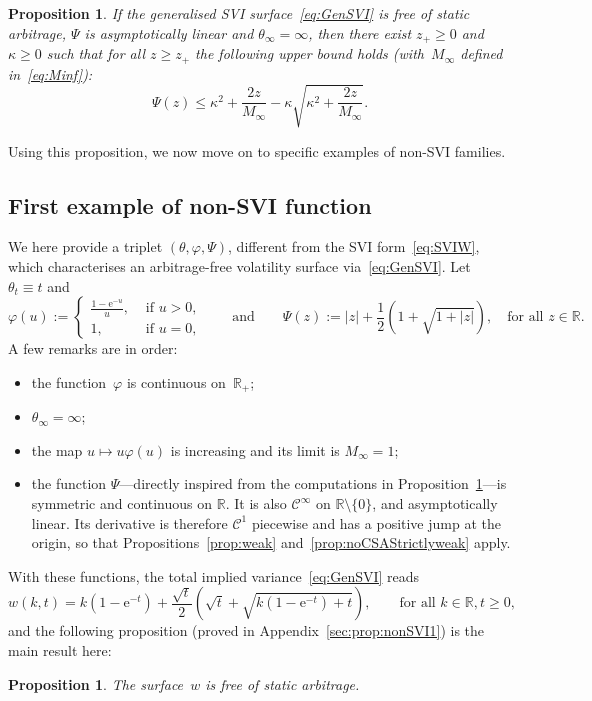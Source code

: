 \documentclass{amsart}[11pt]
\numberwithin{equation}{section}
\newtheorem{proposition}[theorem]{Proposition}
\theoremstyle{definition}
\newcommand{\RR}{\mathbb{R}}
\newcommand{\E}{\mathrm{e}}
\begin{document}
\begin{proposition}\label{prop:EffBoundPsi}
If the generalised SVI surface~\eqref{eq:GenSVI} is free of static arbitrage, 
$\Psi$ is asymptotically linear and $\theta_\infty = \infty$, then there exist $z_+\geq 0$ and $\kappa\geq 0$ 
such that for all $z\geq z_+$ the following upper bound holds (with~$M_\infty$ defined in~\eqref{eq:Minf}):
$$
\Psi(z) \leq \kappa^2+\frac{2z}{M_\infty} - \kappa \sqrt{\kappa^2+\frac{2z}{M_\infty}}.
$$
\end{proposition}

Using this proposition, we now move on to specific examples of non-SVI families.


\subsection{First example of non-SVI function}\label{sec:nonSVI}
We here provide a triplet $(\theta,\varphi,\Psi)$, different from the SVI form~\eqref{eq:SVIW}, 
which characterises an arbitrage-free volatility surface via~\eqref{eq:GenSVI}. 
Let~$\theta_t\equiv t$ and 
$$
\varphi(u) :=
\left\{
\begin{array}{ll}
\displaystyle \frac{1-\E^{-u}}{u}, & \text{ if $u>0$},\\ 
1, & \text{ if $u=0$},
\end{array}
\right.
\qquad\text{and}\qquad
\Psi(z) := 
\displaystyle |z| + \frac{1}{2}\left(1+\sqrt{1+|z|}\right), 
\quad\text{for all }z\in\RR.
$$
A few remarks are in order:
\begin{itemize}
\item the function~$\varphi$ is continuous on~$\RR_+$;
\item $\theta_\infty=\infty$;
\item the map $u \mapsto u\varphi(u)$ is increasing and its limit is $M_\infty=1$;
\item the function $\Psi$---directly inspired from the computations in Proposition~\ref{prop:EffBoundPsi}---is symmetric and continuous on $\RR$.
It is also $\mathcal{C}^\infty$ on $\RR\setminus\{0\}$, and asymptotically linear. 
Its derivative is therefore $\mathcal{C}^1$ piecewise and has a positive jump at the origin, 
so that Propositions~\ref{prop:weak} and~\ref{prop:noCSAStrictlyweak} apply.
\end{itemize}
With these functions, the total implied variance~\eqref{eq:GenSVI} reads
$$
w(k,t) = k\left(1-\E^{-t}\right)+\frac{\sqrt{t}}{2}\left(\sqrt{t}+\sqrt{k\left(1-\E^{-t}\right)+t}\right),
\qquad\text{for all }k\in\RR,t\geq 0,
$$
and the following proposition (proved in Appendix~\ref{sec:prop:nonSVI1}) is the main result here:
\begin{proposition}\label{prop:nonSVI1}
The surface~$w$ is free of static arbitrage.
\end{proposition}
\end{document}
